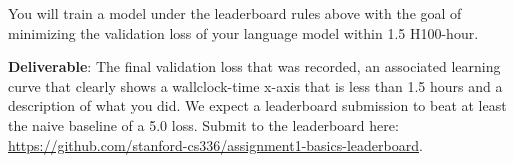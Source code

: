 \begin{answer}

\end{answer}


You will train a model under the leaderboard rules above with the goal of minimizing the validation loss of your language model within 1.5 H100-hour.

\textbf{Deliverable}: The final validation loss that was recorded, an associated learning curve that clearly shows a wallclock-time x-axis that is less than 1.5 hours and a description of what you did. We expect a leaderboard submission to beat at least the naive baseline of a 5.0 loss. Submit to the leaderboard here: \url{https://github.com/stanford-cs336/assignment1-basics-leaderboard}.

\begin{answer}

\end{answer}

